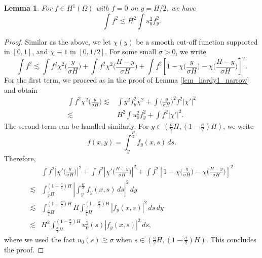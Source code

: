 \documentclass[reqno, 11pt]{amsart}
\theoremstyle{plain}
\newtheorem{lemma}[theorem]{Lemma}
\theoremstyle{definition}
\theoremstyle{remark}
\numberwithin{equation}{section}
\begin{document}
\begin{lemma}\label{lem_hardy2_narrow}
For $f \in H^1(\Omega)$ with $f = 0$ on $y = H/2$, we have
\begin{equation}\label{Hardy2_narrow}
\int f^2 \lesssim H^2 \int u_0^2 f_{y}^2.
\end{equation}
\end{lemma}
\begin{proof}
Similar as the above, we let $\chi(y)$ be a smooth cut-off function supported in $[0,1]$, and $\chi \equiv 1$ in $[0, 1/2]$. For some small $\sigma > 0$, we write
$$
\int f^2 \lesssim \int f^2 \chi^2 \Big( \frac{y}{\sigma H} \Big) + \int f^2 \chi^2 \Big( \frac{H-y}{\sigma H} \Big) + \int f^2 [1-\chi\Big( \frac{y}{\sigma H} \Big) - \chi \Big( \frac{H-y}{\sigma H} \Big)]^2.
$$
For the first term, we proceed as in the proof of Lemma \ref{lem_hardy1_narrow} and obtain
\begin{align*}
\int f^2 \chi^2 \Big( \frac{y}{\sigma H} \Big)\lesssim & \int y^2 f_{y}^2 \chi^2 + \int \Big( \frac{y}{\sigma H} \Big)^2 f^2 |\chi'|^2\\
\lesssim & H^2 \int u_0^2 f_{y}^2 + \int f^2 |\chi'|^2.
\end{align*}
The second term can be handled similarly. For $y \in (\frac{\sigma}{2} H , (1-\frac{\sigma}{2})H)$, we write
$$
f(x,y) = \int_{y}^{\frac{H}{2}}f_y(x,s)\, ds.
$$
Therefore,
$$
\begin{aligned}
 &\int f^2 |\chi' \Big( \frac{y}{\sigma H} \Big)|^2 +  \int f^2 |\chi' \Big( \frac{H-y}{\sigma H} \Big)|^2 + \int f^2  [1-\chi\Big( \frac{y}{\sigma H} \Big) - \chi \Big( \frac{H-y}{\sigma H} \Big)]^2\\
\lesssim & \int_{\frac{\sigma}{2} H}^{(1-\frac{\sigma}{2})H} \left| \int_{y}^{\frac{H}{2}}f_y(x,s)\, ds \right|^2 \, dy\\
\lesssim & \int_{\frac{\sigma}{2} H}^{(1-\frac{\sigma}{2})H} H  \int_{\frac{\sigma}{2} H}^{(1-\frac{\sigma}{2})H} |f_y(x,s)|^2\, ds \, dy\\
\lesssim & H^2 \int_{\frac{\sigma}{2} H}^{(1-\frac{\sigma}{2})H} u_0^2(s)|f_y(x,s)|^2\, ds,
\end{aligned}
$$
where we used the fact $u_0(s) \gtrsim \sigma$ when $s \in (\frac{\sigma}{2} H , (1-\frac{\sigma}{2})H)$. This concludes the proof.
\end{proof}
\end{document}
